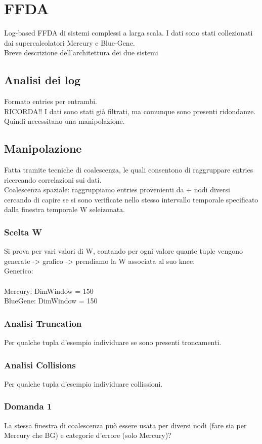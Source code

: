 \chapter{FFDA}
Log-based FFDA di sistemi complessi a larga scala. I dati sono stati collezionati dai supercalcolatori Mercury e Blue-Gene. 
\\Breve descrizione dell'architettura dei due sistemi
\section{Analisi dei log}
Formato entries per entrambi.
\\RICORDA!! I dati sono stati già filtrati, ma comunque sono presenti ridondanze. Quindi necessitano una manipolazione.
\section{Manipolazione}
Fatta tramite tecniche di coalescenza, le quali consentono di raggruppare entries ricercando correlazioni sui dati. 
\\Coalescenza spaziale: raggruppiamo entries provenienti da + nodi diversi cercando di capire se si sono verificate nello stesso intervallo temporale specificato dalla finestra temporale W seleizonata.
\subsection{Scelta W}
Si prova per vari valori di W, contando per ogni valore quante tuple vengono generate -> grafico -> prendiamo la W associata al suo knee.
\\
Generico:
\\
\\Mercury: DimWindow = 150
\\BlueGene: DimWindow = 150
\subsection{Analisi Truncation}
Per qualche tupla d'esempio individuare se sono presenti troncamenti.
\subsection{Analisi Collisions}
Per qualche tupla d'esempio individuare collissioni.
\subsection{Domanda 1}
La stessa finestra di coalescenza può essere usata per diversi nodi (fare sia per Mercury che BG) e categorie d'errore (solo Mercury)?
